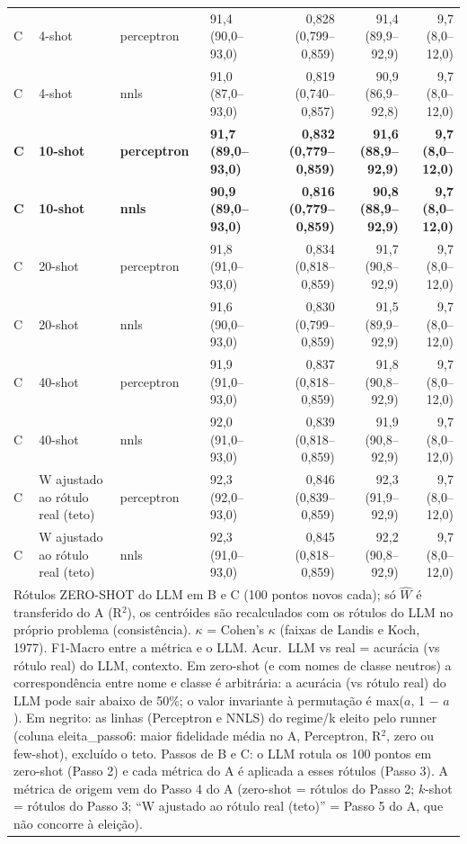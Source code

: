 \begin{table}[htbp]
\begin{tabular}{llllrrr}
C & 4-shot & perceptron & 91,4 (90,0–93,0) & 0,828 (0,799–0,859) & 91,4 (89,9–92,9) & 9,7 (8,0–12,0) \\
C & 4-shot & nnls & 91,0 (87,0–93,0) & 0,819 (0,740–0,857) & 90,9 (86,9–92,8) & 9,7 (8,0–12,0) \\
\textbf{C} & \textbf{10-shot} & \textbf{perceptron} & \textbf{91,7 (89,0–93,0)} & \textbf{0,832 (0,779–0,859)} & \textbf{91,6 (88,9–92,9)} & \textbf{9,7 (8,0–12,0)} \\
\textbf{C} & \textbf{10-shot} & \textbf{nnls} & \textbf{90,9 (89,0–93,0)} & \textbf{0,816 (0,779–0,859)} & \textbf{90,8 (88,9–92,9)} & \textbf{9,7 (8,0–12,0)} \\
C & 20-shot & perceptron & 91,8 (91,0–93,0) & 0,834 (0,818–0,859) & 91,7 (90,8–92,9) & 9,7 (8,0–12,0) \\
C & 20-shot & nnls & 91,6 (90,0–93,0) & 0,830 (0,799–0,859) & 91,5 (89,9–92,9) & 9,7 (8,0–12,0) \\
C & 40-shot & perceptron & 91,9 (91,0–93,0) & 0,837 (0,818–0,859) & 91,8 (90,8–92,9) & 9,7 (8,0–12,0) \\
C & 40-shot & nnls & 92,0 (91,0–93,0) & 0,839 (0,818–0,859) & 91,9 (90,8–92,9) & 9,7 (8,0–12,0) \\
C & W ajustado ao rótulo real (teto) & perceptron & 92,3 (92,0–93,0) & 0,846 (0,839–0,859) & 92,3 (91,9–92,9) & 9,7 (8,0–12,0) \\
C & W ajustado ao rótulo real (teto) & nnls & 92,3 (91,0–93,0) & 0,845 (0,818–0,859) & 92,2 (90,8–92,9) & 9,7 (8,0–12,0) \\
\bottomrule
\multicolumn{7}{p{0.95\linewidth}}{\footnotesize Rótulos ZERO-SHOT do LLM em B e C (100 pontos novos cada); só $\hat{W}$ é transferido do A (R$^2$), os centróides são recalculados com os rótulos do LLM no próprio problema (consistência). $\kappa$ = Cohen's $\kappa$ (faixas de Landis e Koch, 1977). F1-Macro entre a métrica e o LLM. Acur.\ LLM vs real = acurácia (vs rótulo real) do LLM, contexto. Em zero-shot (e com nomes de classe neutros) a correspondência entre nome e classe é arbitrária: a acurácia (vs rótulo real) do LLM pode sair abaixo de 50\%; o valor invariante à permutação é max($a$, 1 $-$ $a$). Em negrito: as linhas (Perceptron e NNLS) do regime/k eleito pelo runner (coluna eleita\_passo6: maior fidelidade média no A, Perceptron, R$^2$, zero ou few-shot), excluído o teto. Passos de B e C: o LLM rotula os 100 pontos em zero-shot (Passo 2) e cada métrica do A é aplicada a esses rótulos (Passo 3). A métrica de origem vem do Passo 4 do A (zero-shot = rótulos do Passo 2; $k$-shot = rótulos do Passo 3; ``W ajustado ao rótulo real (teto)'' = Passo 5 do A, que não concorre à eleição).} \\
\end{tabular}
\end{table}

